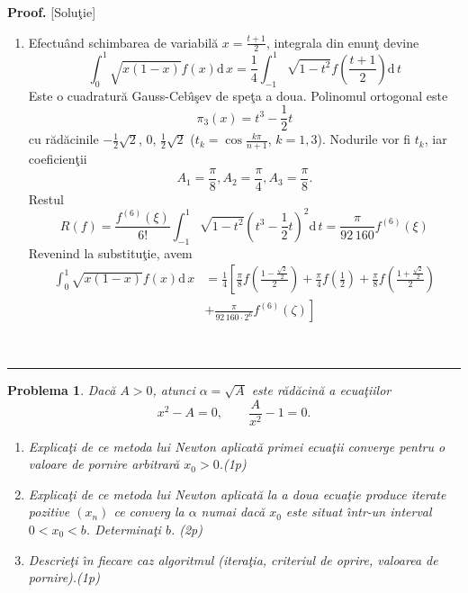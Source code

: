\documentclass[12pt]{article}%
\newtheorem{problem}[theorem]{Problema}
\newenvironment{proof}[1][Proof]{\noindent\textbf{#1.} }{\ \rule{0.5em}{0.5em}}
\begin{document}
\begin{proof}
[Solu\c{t}ie]

\begin{enumerate}
\item[(a)] Efectu\^{a}nd schimbarea de variabil\u{a} $x=\frac{t+1}{2}$,
integrala din enun\c{t} devine%
\[
\int_{0}^{1}\sqrt{x(1-x)}f(x)\mathrm{d}\,x=\frac{1}{4}\int_{-1}^{1}%
\sqrt{1-t^{2}}f\left(  \frac{t+1}{2}\right)  \mathrm{d}\,t
\]
Este o cuadratur\u{a} Gauss-Ceb\^{\i}\c{s}ev de spe\c{t}a a doua. Polinomul
ortogonal este%
\[
\pi_{3}(x)=t^{3}-\frac{1}{2}t
\]
cu r\u{a}d\u{a}cinile $-\frac{1}{2}\sqrt{2}$, $0$, $\frac{1}{2}\sqrt{2}$
($t_{k}=\cos\frac{k\pi}{n+1}$, $k=1,3$). Nodurile vor fi $t_{k}$, iar
coeficien\c{t}ii
\[
A_{1}=\frac{\pi}{8},A_{2}=\frac{\pi}{4},A_{3}=\frac{\pi}{8}.
\]
Restul
\[
R(f)=\frac{f^{(6)}(\xi)}{6!}\int_{-1}^{1}\sqrt{1-t^{2}}\left(  t^{3}-\frac
{1}{2}t\right)  ^{2}\mathrm{d}\,t=\frac{\pi}{92\,160}f^{(6)}(\xi)
\]
Revenind la substitu\c{t}ie, avem%
\begin{align*}
\int_{0}^{1}\sqrt{x(1-x)}f(x)\mathrm{d}\,x  & =\frac{1}{4}\left[  \frac{\pi
}{8}f\left(  \frac{1-\frac{\sqrt{2}}{2}}{2}\right)  +\frac{\pi}{4}f\left(
\frac{1}{2}\right)  +\frac{\pi}{8}f\left(  \frac{1+\frac{\sqrt{2}}{2}}%
{2}\right)  \right.  \\
& \left.  +\frac{\pi}{92\,160\cdot2^{6}}f^{(6)}(\zeta)\right]
\end{align*}

\end{enumerate}
\end{proof}

\begin{problem}
Dac\u{a} $A>0$, atunci $\alpha=\sqrt{A}$ este r\u{a}d\u{a}cin\u{a} a
ecua\c{t}iilor
\[
x^{2}-A=0,\qquad\frac{A}{x^{2}}-1=0.
\]


\begin{enumerate}
\item[(a)] Explica\c{t}i de ce metoda lui Newton aplicat\u{a} primei
ecua\c{t}ii converge pentru o valoare de pornire arbitrar\u{a} $x_{0}>0$.(1p)

\item[(b)] Explica\c{t}i de ce metoda lui Newton aplicat\u{a} la a doua
ecua\c{t}ie produce iterate pozitive $(x_{n})$ ce converg la $\alpha$ numai
dac\u{a} $x_{0}$ este situat \^{\i}ntr-un interval $0<x_{0}<b$.
Determina\c{t}i $b$. (2p)

\item[(c)] Descrie\c{t}i \^{\i}n fiecare caz algoritmul (itera\c{t}ia,
criteriul de oprire, valoarea de pornire).(1p)
\end{enumerate}
\end{problem}
\end{document}
